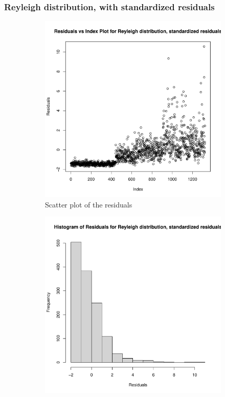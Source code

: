 \documentclass[12pt,a4paper,twoside]{article}
\begin{document}
\subsubsection{Reyleigh distribution, with standardized residuals}
\label{sssec:reyleighstandardized}
\begin{figure}[!ht]
    \begin{subfigure}{.45\textwidth}
        \centering
        \includegraphics[width=\linewidth]{img/reyleigh_residuals_standardized.pdf}
        \caption{Scatter plot of the residuals}
        \label{fig:reyleighstandardizedscatter}
    \end{subfigure}
    \begin{subfigure}{.45\textwidth}
        \centering
        \includegraphics[width=\linewidth]{img/reyleigh_residuals_standardized_hist.pdf}

\end{subfigure}
\end{figure}
\end{document}
